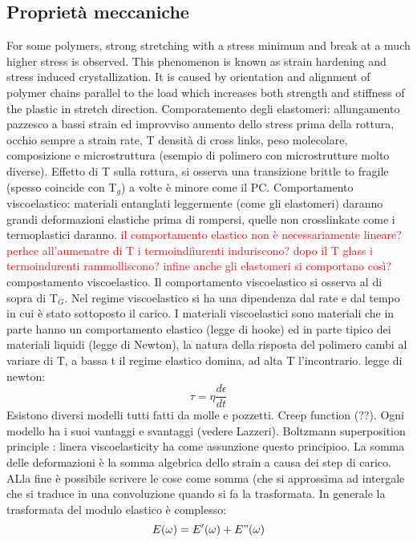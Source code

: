     \subsection{Proprietà meccaniche}
    For some polymers, strong stretching with a stress 
minimum and break at a much higher stress is 
observed. 
This phenomenon is known as strain hardening and stress induced crystallization. It is caused 
by orientation and alignment of polymer chains parallel to the load which increases both 
strength and stiffness of the plastic in stretch direction.
Comporatemento degli elastomeri: allungamento pazzesco a bassi strain ed improvviso aumento dello stress prima della rottura, occhio sempre a strain rate, T densità di cross links, peso molecolare, composizione e microstruttura (esempio di polimero con microstrutture molto diverse).
Effetto di T sulla rottura, si osserva una transizione brittle to fragile (spesso coincide con T$_g$) a volte è minore come il PC. Comportamento viscoelastico: materiali entanglati leggermente (come gli elastomeri) daranno grandi deformazioni elastiche  prima di rompersi, quelle non crosslinkate come i termoplastici daranno.
\textcolor{red}{il comportamento elastico non è necessariamente lineare? perhce all'aumenatre di T i termoindiìurenti induriscono? dopo il T glass i termoindurenti rammolliscono? infine anche gli elastomeri si comportano così?}compostamento viscoelastico. Il comportamento viscoelastico si osserva al di sopra di T$_G$. Nel regime viscoelastico si ha una dipendenza dal rate e dal tempo in cui è stato sottoposto il carico. I materiali viscoelastici sono materiali che in parte hanno un comportamento elastico (legge di hooke) ed in parte tipico dei materiali liquidi (legge di Newton), la natura della risposta del polimero cambi al variare di T, a bassa t il regime elastico domina, ad alta T l'incontrario.
legge di newton:
\begin{equation}
    \tau=\eta\frac{d \epsilon}{dt}
\end{equation}
Esistono diversi modelli tutti fatti da molle e pozzetti. Creep function (??). Ogni modello ha i suoi vantaggi e svantaggi (vedere Lazzeri). Boltzmann superposition principle :  linera viscoelasticity ha come assunzione questo principioo.  La somma delle deformazioni è la somma algebrica dello strain a causa dei step di carico. ALla fine è possibile scrivere le cose come somma (che si approssima ad intergale che si traduce in una convoluzione quando si fa la trasformata.
In generale la trasformata del modulo elastico è complesso:
\begin{equation}
    E(\omega)=E'(\omega)+E"(\omega)
\end{equation}
